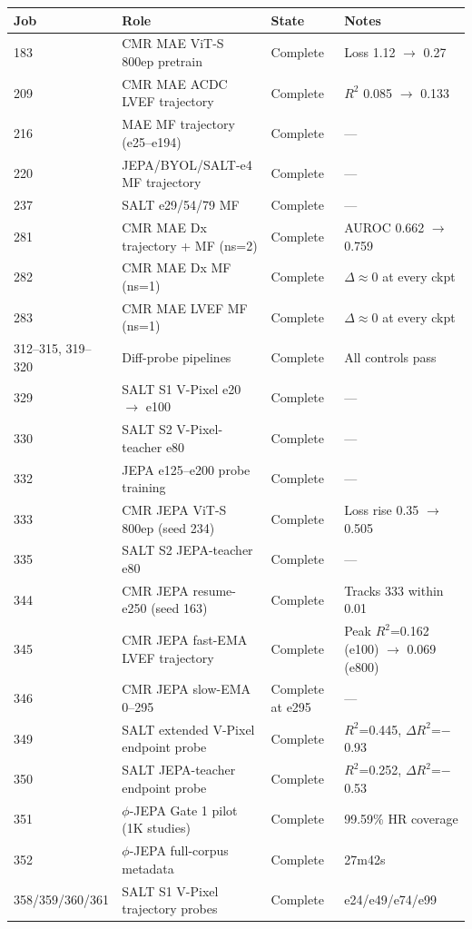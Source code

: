 \documentclass{article}
\begin{document}
\begin{center}
\small
\begin{tabular}{llll}
\toprule
Job & Role & State & Notes \\
\midrule
183 & CMR MAE ViT-S 800ep pretrain & Complete & Loss 1.12 $\to$ 0.27 \\
209 & CMR MAE ACDC LVEF trajectory & Complete & $R^2$ 0.085 $\to$ 0.133 \\
216 & MAE MF trajectory (e25--e194) & Complete & --- \\
220 & JEPA/BYOL/SALT-e4 MF trajectory & Complete & --- \\
237 & SALT e29/54/79 MF & Complete & --- \\
281 & CMR MAE Dx trajectory + MF (ns=2) & Complete & AUROC 0.662 $\to$ 0.759 \\
282 & CMR MAE Dx MF (ns=1) & Complete & $\Delta\approx0$ at every ckpt \\
283 & CMR MAE LVEF MF (ns=1) & Complete & $\Delta\approx0$ at every ckpt \\
312--315, 319--320 & Diff-probe pipelines & Complete & All controls pass \\
329 & SALT S1 V-Pixel e20 $\to$ e100 & Complete & --- \\
330 & SALT S2 V-Pixel-teacher e80 & Complete & --- \\
332 & JEPA e125--e200 probe training & Complete & --- \\
333 & CMR JEPA ViT-S 800ep (seed 234) & Complete & Loss rise 0.35 $\to$ 0.505 \\
335 & SALT S2 JEPA-teacher e80 & Complete & --- \\
344 & CMR JEPA resume-e250 (seed 163) & Complete & Tracks 333 within 0.01 \\
345 & CMR JEPA fast-EMA LVEF trajectory & Complete & Peak $R^2$=0.162 (e100) $\to$ 0.069 (e800) \\
346 & CMR JEPA slow-EMA 0--295 & Complete at e295 & --- \\
349 & SALT extended V-Pixel endpoint probe & Complete & $R^2$=0.445, $\Delta R^2$=$-$0.93 \\
350 & SALT JEPA-teacher endpoint probe & Complete & $R^2$=0.252, $\Delta R^2$=$-$0.53 \\
351 & $\phi$-JEPA Gate 1 pilot (1K studies) & Complete & 99.59\% HR coverage \\
352 & $\phi$-JEPA full-corpus metadata & Complete & 27m42s \\
358/359/360/361 & SALT S1 V-Pixel trajectory probes & Complete & e24/e49/e74/e99 \\

\end{tabular}
\end{center}
\end{document}
